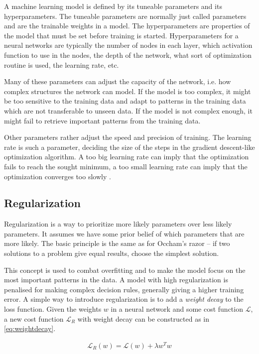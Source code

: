 A machine learning model is defined by its tuneable parameters and its hyperparameters. The tuneable parameters are normally just called parameters and are the trainable weights in a model. The hyperparameters are properties of the model that must be set before training is started. Hyperparameters for a neural networks are typically the number of nodes in each layer, which activation function to use in the nodes, the depth of the network, what sort of optimization routine is used, the learning rate, etc. 

Many of these parameters can adjust the capacity of the network, i.e. how complex structures the network can model. If the model is too complex, it might be too sensitive to the training data and adapt to patterns in the training data which are not transferable to unseen data. If the model is not complex enough, it might fail to retrieve important patterns from the training data.

Other parameters rather adjust the speed and precision of training. The learning rate is such a parameter, deciding the size of the steps in the gradient descent-like optimization algorithm. A too big learning rate can imply that the optimization fails to  reach the sought minimum, a too small learning rate can imply that the optimization converges too slowly \citep{Goodfellow-et-al-2016}. 

\subsection{Regularization}\label{sec:regul}

Regularization is a way to prioritize more likely parameters over less likely parameters. It assumes we have some prior belief of which parameters that are more likely. The basic principle is the same as for Occham's razor -- if two solutions to a problem give equal results, choose the simplest solution.

This concept is used to combat overfitting and to make the model focus on the most important patterns in the data. A model with high regularization is penalised for making complex decision rules, generally giving a higher training error. A simple way to introduce regularization is to add a \emph{weight decay} to the loss function. Given the weights $w$ in a neural network and some cost function $\mathcal{L}$, a new cost function $\mathcal{L}_R$ with weight decay can be constructed as in \ref{eq:weightdecay}.

\begin{align}
    \mathcal{L}_R (w) = \mathcal{L}(w) + \lambda w^T w
    \label{eq:weightdecay}
\end{align}

